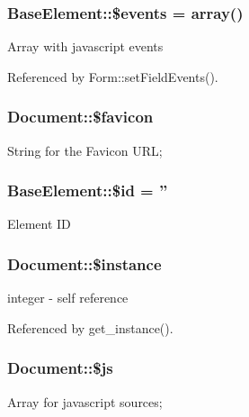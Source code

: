 \subsubsection[{\$events}]{\setlength{\rightskip}{0pt plus 5cm}BaseElement::\$events = array()}\label{classBaseElement_a02cebe45d277b4ff8f29db08bad371ba}
Array with javascript events 

Referenced by Form::setFieldEvents().

\subsubsection[{\$favicon}]{\setlength{\rightskip}{0pt plus 5cm}Document::\$favicon}\label{classDocument_ad74353c065d3fe06667bc549ed0977e7}
String for the Favicon URL; 
\subsubsection[{\$id}]{\setlength{\rightskip}{0pt plus 5cm}BaseElement::\$id = ''}\label{classBaseElement_a11b6989c43b53869a09f5ce65aa55b45}
Element ID 
\subsubsection[{\$instance}]{\setlength{\rightskip}{0pt plus 5cm}Document::\$instance}\label{classDocument_a2699d681667ea5a811ec6da1bf2a5087}
integer -\/ self reference 

Referenced by get\_\-instance().

\subsubsection[{\$js}]{\setlength{\rightskip}{0pt plus 5cm}Document::\$js}\label{classDocument_aff8d5c694d27719238793df5c3dbe55f}
Array for javascript sources; 
